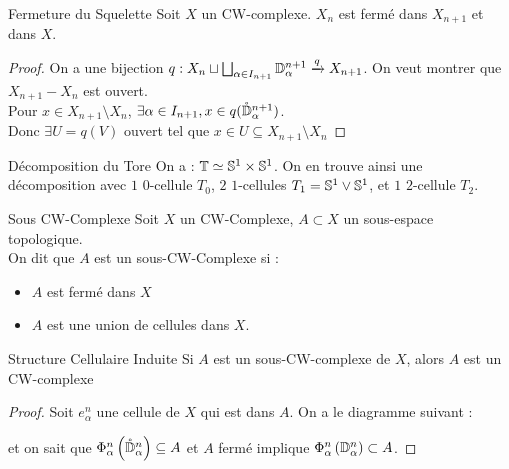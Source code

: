 \documentclass{cours}
\begin{document}
\begin{propositionfr}{Fermeture du Squelette}{}
    Soit $X$ un CW-complexe. $X_{n}$ est fermé dans $X_{n+1}$ et dans $X$. 
\end{propositionfr}
\begin{proof}
    On a une bijection $q : X_{n} \sqcup \bigsqcup_{\alpha\in I_{n + 1}}\D_{\alpha}^{n + 1} \xrightarrow{q} X_{n + 1}$. On veut montrer que $X_{n + 1} - X_{n}$ est ouvert. \\
    Pour $x \in X_{n + 1} \setminus X_{n}$, $\exists \alpha \in I_{n + 1}, x \in q(\mathring{\D}_{\alpha}^{n + 1})$.\\
    Donc $\exists U = q(V)$ ouvert tel que $x \in U \subseteq X_{n + 1}\setminus X_{n}$
\end{proof}

\begin{propositionfr}{Décomposition du Tore}{}
    On a : $\mathbb{T} \simeq \S^{1} \times \S^{1}$. On en trouve ainsi une décomposition avec $1$ $0$-cellule $T_{0}$, $2$ $1$-cellules $T_{1} = \S^{1} \vee \S^{1}$, et $1$ $2$-cellule $T_{2}$.
\end{propositionfr}

\begin{définition}{Sous CW-Complexe}{}
    Soit $X$ un CW-Complexe, $A \subset X$ un sous-espace topologique.\\
    On dit que $A$ est un sous-CW-Complexe si :
    \begin{itemize}
        \item $A$ est fermé dans $X$
        \item $A$ est une union de cellules dans $X$. 
    \end{itemize}
\end{définition}

\begin{propositionfr}{Structure Cellulaire Induite}{}
    Si $A$ est un sous-CW-complexe de $X$, alors $A$ est un CW-complexe
\end{propositionfr}
\begin{proof}
    Soit $e_{\alpha}^{n}$ une cellule de $X$ qui est dans $A$. On a le diagramme suivant : 
    \begin{center}
    \end{center}
    et on sait que $\Phi_{\alpha}^{n}\left(\mathring{\D}_{\alpha}^{n}\right)\subseteq A$ et $A$ fermé implique $\Phi_{\alpha}^{n}\left(\D_{\alpha}^{n}\right) \subset A$.
\end{proof}
\end{document}

